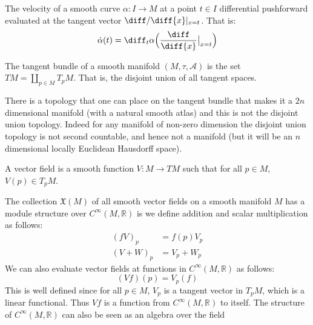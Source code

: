         \begin{definition}
            The velocity of a smooth curve $\alpha:I\rightarrow{M}$ at a point
            $t\in{I}$ differential pushforward evaluated at the tangent vector
            $\diff/\diff{x}|_{x=t}$. That is:
            \begin{equation}
                \dot{\alpha}(t)=
                    \diff_{t}\alpha\Big(\frac{\diff}{\diff{x}}\big|_{x=t}\Big)
            \end{equation}
        \end{definition}
        \begin{definition}
            The tangent bundle of a smooth manifold $(M,\tau,\mathcal{A})$ is
            the set $TM=\coprod_{p\in{M}}T_{p}M$. That is, the disjoint union of
            all tangent spaces.
        \end{definition}
        There is a topology that one can place on the tangent bundle that makes
        it a $2n$ dimensional manifold (with a natural smooth atlas) and this is
        not the disjoint union topology. Indeed for any manifold of non-zero
        dimension the disjoint union topology is not second countable, and hence
        not a manifold (but it will be an $n$ dimensional locally Euclidean
        Hausdorff space).
        \begin{definition}
            A vector field is a smooth function $V:M\rightarrow{TM}$ such that
            for all $p\in{M}$, $V(p)\in{T}_{p}M$.
        \end{definition}
        The collection $\mathfrak{X}(M)$ of all smooth vector fields on a smooth
        manifold $M$ has a module structure over $C^{\infty}(M,\mathbb{R})$ is
        we define addition and scalar multiplication as follows:
        \begin{align}
            (fV)_{p}&=f(p)V_{p}\\
            (V+W)_{p}&=V_{p}+W_{p}
        \end{align}
        We can also evaluate vector fields at functions in
        $C^{\infty}(M,\mathbb{R})$ as follows:
        \begin{equation}
            (Vf)(p)=V_{p}(f)
        \end{equation}
        This is well defined since for all $p\in{M}$, $V_{p}$ is a tangent
        vector in $T_{p}M$, which is a linear functional. Thus $Vf$ is a
        function from $C^{\infty}(M,\mathbb{R})$ to itself. The structure of
        $C^{\infty}(M,\mathbb{R})$ can also be seen as an algebra over the field
